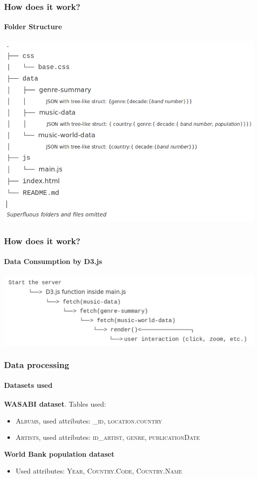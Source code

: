 \documentclass[aspectratio=43,10pt]{beamer}
\begin{document}
\begin{frame}
    \frametitle{How does it work?}
    \framesubtitle{Folder Structure}
    \includegraphics[width=1\linewidth]{imagens/folder_structure.png}
\end{frame}

\begin{frame}
    \frametitle{How does it work?}
    \framesubtitle{Data Consumption by D3.js}
    \includegraphics[width=1\linewidth]{imagens/action.png}
\end{frame}

\begin{frame}
    \frametitle{Data processing}
    \framesubtitle{Datasets used}
        \textbf{WASABI dataset}. Tables used:
        \begin{itemize}
            \item \textsc{Albums}, used attributes: \textsc{\_id}, \textsc{location.country}
            \item \textsc{Artists}, used attributes: \textsc{id\_artist}, \textsc{genre}, \textsc{publicationDate}
        \end{itemize}
        \textbf{World Bank population dataset}
        \begin{itemize}
            \item Used attributes: \textsc{Year}, \textsc{Country.Code}, \textsc{Country.Name}
        \end{itemize}
\end{frame}
\end{document}
